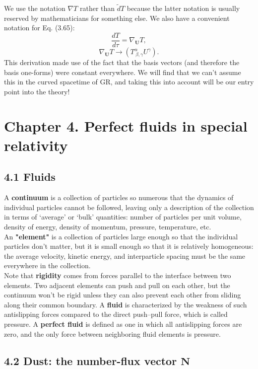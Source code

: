 \documentclass[12pt]{book}
\begin{document}
    We use the notation \(\nabla T\) rather than \(\tilde{d}T\) because the latter notation is usually reserved by mathematicians for something else. We also have a convenient notation for Eq. (3.65):
    \[
    \frac{dT}{d\tau} = \nabla_{\mathbf{U}} T, \tag{3.67}
    \]
    \[
    \nabla_{\mathbf{U}} T \rightarrow \left(T^\alpha_{\ \beta, \gamma} U^\gamma\right). \tag{3.68}
    \]
    This derivation made use of the fact that the basis vectors (and therefore the basis one-forms) were constant everywhere. We will find that we can’t assume this in the curved spacetime of GR, and taking this into account will be our entry point into the theory!
    
\section{Chapter 4. Perfect fluids in special relativity}

    \subsection{4.1 Fluids}
        A \textbf{continuum} is a collection of particles so numerous that the dynamics of individual particles cannot be followed, leaving only a description of the collection in terms of ‘average’ or ‘bulk’ quantities: number of particles per unit volume, density of energy, density of momentum, pressure, temperature, etc.\\
        An \textbf{"element"} is a collection of particles large enough so that the individual particles don’t matter, but it is small enough so that it is relatively homogeneous: the average velocity, kinetic energy, and interparticle spacing must be the same everywhere in the collection.\\
        Note that \textbf{rigidity} comes from forces parallel to the interface between two elements. Two adjacent elements can push and pull on each other, but the continuum won’t be rigid unless they can also prevent each other from sliding along their common boundary. A \textbf{fluid} is characterized by the weakness of such antislipping forces compared to the direct push–pull force, which is called pressure. A \textbf{perfect fluid} is defined as one in which all antislipping forces are zero, and the only force between neighboring fluid elements is pressure.

    \subsection{4.2 Dust: the number-flux vector $\mathbf{N}$}
    
\end{document}
